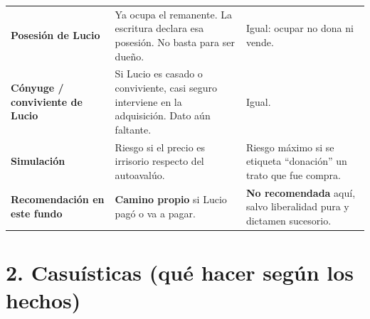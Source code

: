 \documentclass[12pt,a4paper]{article}
\begin{document}
{\begin{tabularx}{\textwidth}{>{\bfseries}p{3.15cm} >{\raggedright\arraybackslash}p{5.55cm} X}
Posesión de Lucio & Ya ocupa el remanente. La escritura declara esa posesión. No basta para ser dueño. & Igual: ocupar no dona ni vende. \\
Cónyuge / conviviente de Lucio & Si Lucio es casado o conviviente, casi seguro interviene en la adquisición. Dato aún faltante. & Igual. \\
Simulación & Riesgo si el precio es irrisorio respecto del autoavalúo. & Riesgo máximo si se etiqueta ``donación'' un trato que fue compra. \\
Recomendación en este fundo & \textbf{Camino propio} si Lucio pagó o va a pagar. & \textbf{No recomendada} aquí, salvo liberalidad pura y dictamen sucesorio. \\
\bottomrule
\end{tabularx}}

\section*{2. Casuísticas (qué hacer según los hechos)}
\end{document}
